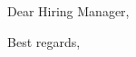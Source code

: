 \documentclass[10pt,a4paper]{letter}
\begin{document}
\begin{letter}{}
  \pagestyle{plain}

  \opening{Dear Hiring Manager,}

  \closing{Best regards,}
\end{letter}
\end{document}
